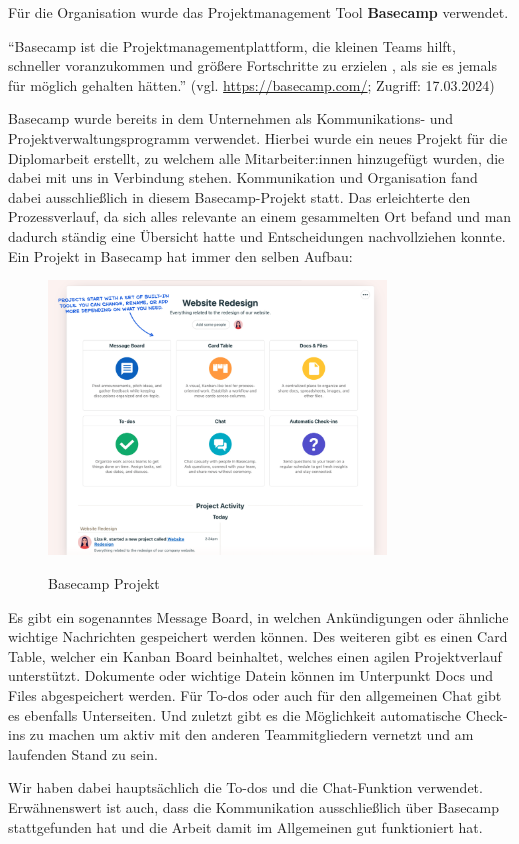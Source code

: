 Für die Organisation wurde das Projektmanagement Tool \textbf{Basecamp} verwendet.

“Basecamp ist die Projektmanagementplattform, die kleinen Teams hilft, schneller voranzukommen und größere Fortschritte zu erzielen , als sie es jemals für möglich gehalten hätten.”
\newline
(vgl. \url{https://basecamp.com/}; Zugriff: 17.03.2024)

Basecamp wurde bereits in dem Unternehmen als Kommunikations- und Projektverwaltungsprogramm verwendet. Hierbei wurde ein neues Projekt für die Diplomarbeit erstellt, zu welchem alle Mitarbeiter:innen hinzugefügt wurden, die dabei mit uns in Verbindung stehen.
Kommunikation und Organisation fand dabei ausschließlich in diesem Basecamp-Projekt statt. Das erleichterte den Prozessverlauf, da sich alles relevante an einem gesammelten Ort befand und man dadurch ständig eine Übersicht hatte und Entscheidungen nachvollziehen konnte.
Ein Projekt in Basecamp hat immer den selben Aufbau:

\begin{figure}[h!]
    \centering
    \includegraphics[width=0.8\textwidth]{pics/basecamp-project-overview.png}
    \caption{Basecamp Projekt}
    \cite{basecamp_project}
    \label{fig:mesh1}
\end{figure}

Es gibt ein sogenanntes Message Board, in welchen Ankündigungen oder ähnliche wichtige Nachrichten gespeichert werden können. Des weiteren gibt es einen Card Table, welcher ein Kanban Board beinhaltet, welches einen agilen Projektverlauf unterstützt. Dokumente oder wichtige Datein können im Unterpunkt Docs und Files abgespeichert werden. Für To-dos oder auch für den allgemeinen Chat gibt es ebenfalls Unterseiten. Und zuletzt gibt es die Möglichkeit automatische Check-ins zu machen um aktiv mit den anderen Teammitgliedern vernetzt und am laufenden Stand zu sein.

Wir haben dabei hauptsächlich die To-dos und die Chat-Funktion verwendet. Erwähnenswert ist auch, dass die Kommunikation ausschließlich über Basecamp stattgefunden hat und die Arbeit damit im Allgemeinen gut funktioniert hat.